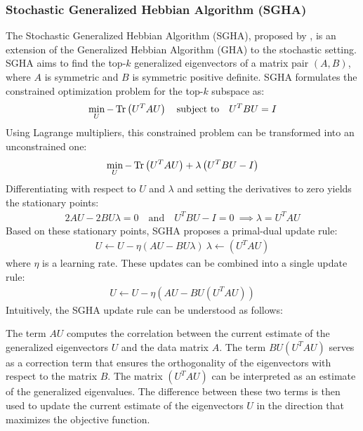 \subsubsection{Stochastic Generalized Hebbian Algorithm (SGHA)}
The Stochastic Generalized Hebbian Algorithm (SGHA), proposed by \citet{chen2019constrained}, is an extension of the Generalized Hebbian Algorithm (GHA) to the stochastic setting. SGHA aims to find the top-$k$ generalized eigenvectors of a matrix pair $(A, B)$, where $A$ is symmetric and $B$ is symmetric positive definite.
SGHA formulates the constrained optimization problem for the top-$k$ subspace as:
\begin{align}
\min_{U} -\operatorname{Tr} \left(U^T A U\right) \quad \text{subject to} \quad U^T B U = I
\end{align}
Using Lagrange multipliers, this constrained problem can be transformed into an unconstrained one:
\begin{align}
\min_{U} -\operatorname{Tr}\left(U^T A U \right) + \lambda \left(U^T B U - I\right)
\end{align}
Differentiating with respect to $U$ and $\lambda$ and setting the derivatives to zero yields the stationary points:
\begin{align}
2 A U - 2 B U \lambda = 0 \quad \text{and} \quad U^T B U - I = 0 \
\implies \lambda = U^T A U
\end{align}
Based on these stationary points, SGHA proposes a primal-dual update rule:
\begin{align}
U \leftarrow U - \eta \left( A U - B U \lambda \right) \
\lambda \leftarrow \left( U^T A U \right)
\end{align}
where $\eta$ is a learning rate.
These updates can be combined into a single update rule:
\begin{align}
U \leftarrow U - \eta \left( A U - B U \left( U^T A U \right) \right)
\end{align}
Intuitively, the SGHA update rule can be understood as follows:

The term $A U$ computes the correlation between the current estimate of the generalized eigenvectors $U$ and the data matrix $A$.
The term $B U \left( U^T A U \right)$ serves as a correction term that ensures the orthogonality of the eigenvectors with respect to the matrix $B$. The matrix $\left( U^T A U \right)$ can be interpreted as an estimate of the generalized eigenvalues.
The difference between these two terms is then used to update the current estimate of the eigenvectors $U$ in the direction that maximizes the objective function.

